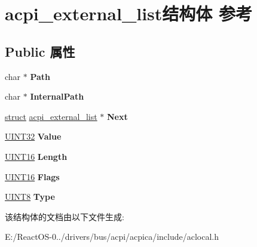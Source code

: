 \hypertarget{structacpi__external__list}{}\section{acpi\+\_\+external\+\_\+list结构体 参考}
\label{structacpi__external__list}
\subsection*{Public 属性}
\begin{DoxyCompactItemize}
\item 
\mbox{\label{structacpi__external__list_adedc54f3aafb5efc232e3914c55ad816}} 
char $\ast$ {\bfseries Path}
\item 
\mbox{\label{structacpi__external__list_a00aa7079499c15506536dcb92328075f}} 
char $\ast$ {\bfseries Internal\+Path}
\item 
\mbox{\label{structacpi__external__list_ade2fe979ce72eca8c79e09991a987bc9}} 
\hyperlink{interfacestruct}{struct} \hyperlink{structacpi__external__list}{acpi\+\_\+external\+\_\+list} $\ast$ {\bfseries Next}
\item 
\mbox{\label{structacpi__external__list_a0f63693ba15cc4163298d70617289fb0}} 
\hyperlink{_processor_bind_8h_ae1e6edbbc26d6fbc71a90190d0266018}{U\+I\+N\+T32} {\bfseries Value}
\item 
\mbox{\label{structacpi__external__list_a31e7ae488105165372163edcc21de4b1}} 
\hyperlink{_processor_bind_8h_a09f1a1fb2293e33483cc8d44aefb1eb1}{U\+I\+N\+T16} {\bfseries Length}
\item 
\mbox{\label{structacpi__external__list_ac5e05a799cad68be0d977aec8a73fbc3}} 
\hyperlink{_processor_bind_8h_a09f1a1fb2293e33483cc8d44aefb1eb1}{U\+I\+N\+T16} {\bfseries Flags}
\item 
\mbox{\label{structacpi__external__list_a8f5c190ae7d7b2ba1f28e5bb242b5d42}} 
\hyperlink{_processor_bind_8h_ab27e9918b538ce9d8ca692479b375b6a}{U\+I\+N\+T8} {\bfseries Type}
\end{DoxyCompactItemize}


该结构体的文档由以下文件生成\+:\begin{DoxyCompactItemize}
\item 
E\+:/\+React\+O\+S-\/0../drivers/bus/acpi/acpica/include/aclocal.\+h\end{DoxyCompactItemize}
